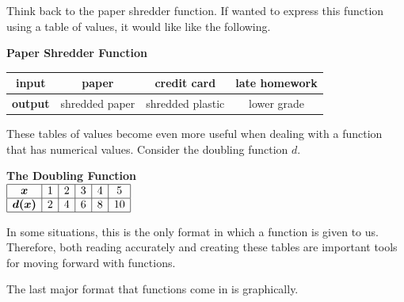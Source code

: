 \begin{presentation}
\begin{example}\label{Table of Values}
	Think back to the paper shredder function. If wanted to express this function using a table of values, it would like like the following.
\begin{center}
\textbf{Paper Shredder Function} \\
\begin{tabular}{|c|c|c|c|}
\hline
\textbf{input} & paper & credit card & late homework \\
\hline
\textbf{output} & shredded paper & shredded plastic & lower grade \\	
\hline
\end{tabular}
\end{center}

\noindent
 These tables of values become even more useful when dealing with a function that has numerical values. Consider the doubling function $d$.

\begin{center}

\textbf{The Doubling Function} \\
$
\begin{array}{|c|c|c|c|c|c|}
 \hline
 \bm{x} & 1 & 2 & 3 & 4 & 5 \\
 \hline
 \bm{d(x)} & 2 & 4 & 6 & 8 & 10 \\
 \hline
\end{array}
$
\end{center}

\noindent
In some situations, this is the only format in which a function is given to us. Therefore, both reading accurately and creating these tables are important tools for moving forward with functions. 
\end{example}
\end{presentation}

The last major format that functions come in is graphically. 

\pagebreak 

